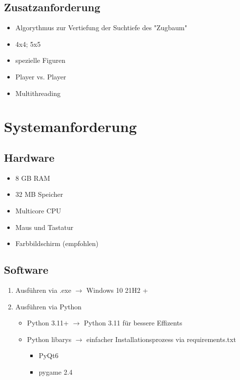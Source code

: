 \documentclass{article}
\begin{document}
\subsection{Zusatzanforderung}
\begin{itemize}
    \item Algorythmus zur Vertiefung der Suchtiefe des "Zugbaum"
    \item 4x4; 5x5
    \item spezielle Figuren
    \item Player vs. Player
    \item Multithreading
\end{itemize}


\newpage
\section{Systemanforderung}\label{section-requirements}

\subsection{Hardware}
\begin{itemize}
    \item 8 GB RAM
    \item 32 MB Speicher
    \item Multicore CPU
    \item Maus und Tastatur
    \item Farbbildschirm (empfohlen)
\end{itemize}

\subsection{Software}
\begin{enumerate}
    \item Ausführen via .exe $\rightarrow$ Windows 10 21H2 +
    \item Ausführen via Python
        \begin{itemize}
            \item Python 3.11+ $\rightarrow$ Python 3.11 für bessere Effizents
            \item Python libarys $\rightarrow$ einfacher Installationsprozess via requirements.txt
                \begin{itemize}
                    \item PyQt6
                    \item pygame 2.4
                \end{itemize}
        \end{itemize}
\end{enumerate}
\end{document}

